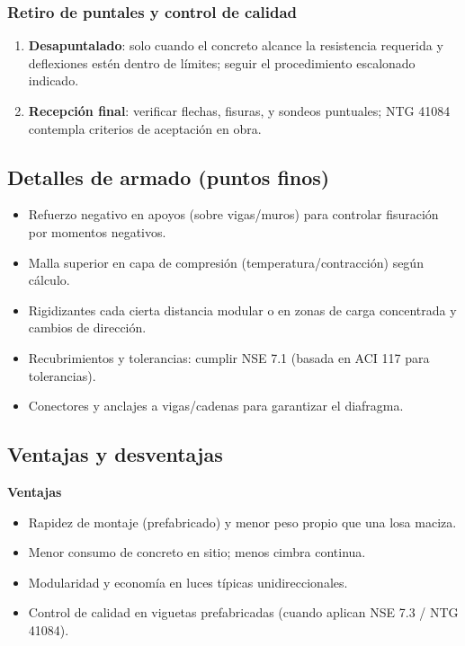 \documentclass[12pt]{article}
\begin{document}
	\subsubsection{ Retiro de puntales y control de calidad}
	\begin{enumerate}
		\item[15.] \textbf{Desapuntalado}: solo cuando el concreto alcance la resistencia requerida y deflexiones estén dentro de límites; seguir el procedimiento escalonado indicado.
		\item[16.] \textbf{Recepción final}: verificar flechas, fisuras, y sondeos puntuales; NTG 41084 contempla criterios de aceptación en obra.
	\end{enumerate}
	
	\subsection{Detalles de armado (puntos finos)}
	\begin{itemize}
		\item Refuerzo negativo en apoyos (sobre vigas/muros) para controlar fisuración por momentos negativos.
		\item Malla superior en capa de compresión (temperatura/contracción) según cálculo.
		\item Rigidizantes cada cierta distancia modular o en zonas de carga concentrada y cambios de dirección.
		\item Recubrimientos y tolerancias: cumplir NSE 7.1 (basada en ACI 117 para tolerancias).
		\item Conectores y anclajes a vigas/cadenas para garantizar el diafragma.
	\end{itemize}
	
	\subsection{Ventajas y desventajas}
	\textbf{Ventajas}
	\begin{itemize}
		\item Rapidez de montaje (prefabricado) y menor peso propio que una losa maciza.
		\item Menor consumo de concreto en sitio; menos cimbra continua.
		\item Modularidad y economía en luces típicas unidireccionales.
		\item Control de calidad en viguetas prefabricadas (cuando aplican NSE 7.3 / NTG 41084).
	\end{itemize}
	
\end{document}
